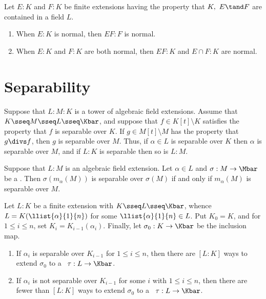 \documentclass{article}
\begin{document}
  \begin{ttheorem}
    Let \( E:K \) and \( F:K \) be finite extensions having the property that \( K,\ E\tand F \) are contained in a field \( L \).
    \begin{enumerate}[label=(\alph*)]
      \item When \( E:K \) is normal, then \( EF:F \) is normal.
      \item When \( E:K \) and \( F:K \) are both normal, then \( EF:K \) and \( E\cap F:K \) are normal.
    \end{enumerate}
  \end{ttheorem}

\section{Separability}
  \begin{tproposition}
    Suppose that \( L:M:K \) is a tower of algebraic field extensions. Assume that \( K\sseq M\sseq L\sseq \Kbar \), and suppose that \( f\in K[t]\setminus K \) satisfies the property that \( f \) is separable over \( K \). If \( g\in M[t]\setminus M \) has the property that \( g\divs f \), then \( g \) is separable over \( M \). Thus, if \( \alpha\in L \) is separable over \( K \) then \( \alpha \) is separable over \( M \), and if \( L:K \) is separable then so is \( L:M \).
  \end{tproposition}

  \begin{tproposition}
    Suppose that \( L:M \) is an algebraic field extension. Let \( \alpha\in L \) and \( \sigma:M\to\Mbar \) be a \homo. Then \( \sigma(m_\alpha(M)) \) is separable over \( \sigma(M) \) if and only if \( m_\alpha(M) \) is separable over \( M \).
  \end{tproposition}

  \begin{ttheorem}
    Let \( L:K \) be a finite extension with \( K\sseq L\sseq \Kbar \), whence \( L=K(\llist{\alpha}{1}{n}) \) for some \( \llist{\alpha}{1}{n}\in L \). Put \( K_0=K \), and for \( 1\leq i\leq n \), set \( K_i=K_{i-1}(\alpha_i) \). Finally, let \( \sigma_0:K\to\Kbar \) be the inclusion map.
    \begin{enumerate}[label=(\roman*)]
      \item If \( \alpha_i \) is separable over \( K_{i-1} \) for \( 1\leq i\leq n \), then there are \( [L:K] \) ways to extend \( \sigma_0 \) to a \homo~\( \tau:L\to\Kbar \).
      \item If \( \alpha_i \) is not separable over \( K_{i-1} \) for some \( i \) with \( 1\leq i\leq n \), then there are fewer than \( [L:K] \) ways to extend \( \sigma_0 \) to a \homo~\( \tau:L\to\Kbar \).
    \end{enumerate}
  \end{ttheorem}
\end{document}
